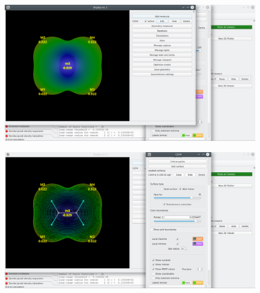 \documentclass[a4paper,10pt]{article}
\begin{document}
\begin{minipage}{.5\linewidth}
\begin{figure}[H]
\caption{\label{fig:45}}
\begin{center}
\includegraphics[width=0.95\linewidth]{damqt_QS_fig45.png}
\end{center}
\end{figure} 
\end{minipage}
\begin{minipage}{.5\linewidth}
\begin{figure}[H]
\caption{\label{fig:46}}
\begin{center}
\includegraphics[width=0.95\linewidth]{damqt_QS_fig46.png}
\end{center}
\end{figure} 
\end{minipage}
\end{document}
